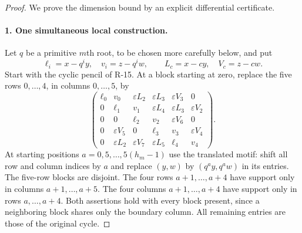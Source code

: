 \documentclass[11pt,a4paper]{article}
\theoremstyle{definition}\newtheorem{definition}{Definition}
\begin{document}
\begin{proof}
We prove the dimension bound by an explicit differential certificate.

\paragraph{1. One simultaneous local construction.}
Let $q$ be a primitive $m$th root, to be chosen more carefully below,
and put
\[
 \ell_i=x-q^iy,\quad v_i=z-q^iw,\qquad
 L_c=x-cy,\quad V_c=z-cw.
\]
Start with the cyclic pencil of R-15. At a block starting at zero,
replace the five rows $0,\ldots,4$, in columns $0,\ldots,5$, by
\begin{equation}\label{R20:motif}
 \begin{pmatrix}
 \ell_0&v_0&\varepsilon L_2&\varepsilon L_3&\varepsilon V_3&0\\
 0&\ell_1&v_1&\varepsilon L_4&\varepsilon L_3&\varepsilon V_2\\
 0&0&\ell_2&v_2&\varepsilon V_6&0\\
 0&\varepsilon V_5&0&\ell_3&v_3&\varepsilon V_4\\
 0&\varepsilon L_2&\varepsilon V_7&\varepsilon L_5&\ell_4&v_4
 \end{pmatrix}.
\end{equation}
At starting positions $a=0,5,\ldots,5(h_m-1)$ use the translated
motif: shift all row and column indices by $a$ and replace
$(y,w)$ by $(q^ay,q^aw)$ in its entries. The five-row blocks are
disjoint. The four rows $a+1,\ldots,a+4$ have support only in
columns $a+1,\ldots,a+5$. The four columns
$a+1,\ldots,a+4$ have support only in rows $a,\ldots,a+4$.
Both assertions hold with every block present, since a neighboring
block shares only the boundary column. All remaining entries are
those of the original cycle.


\end{proof}
\end{document}
